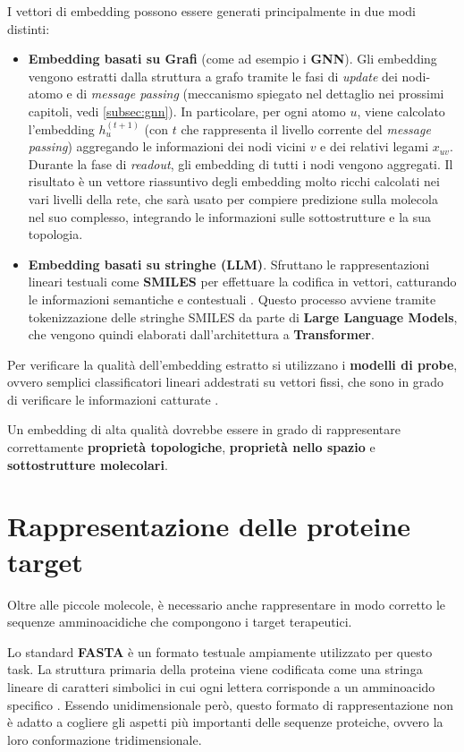I vettori di embedding possono essere generati principalmente in due modi distinti:
\begin{itemize}
    \item \textbf{Embedding basati su Grafi} (come ad esempio i \textbf{GNN}). Gli embedding vengono estratti dalla struttura a grafo tramite le fasi di \textit{update} dei nodi-atomo e di \textit{message passing} \cite{wangEvaluatingSelfSupervisedLearning2023} (meccanismo spiegato nel dettaglio nei prossimi capitoli, vedi \ref{subsec:gnn}).
    In particolare, per ogni atomo $u$, viene calcolato l'embedding $h_u^{(t+1)}$ (con $t$ che rappresenta il livello corrente del \textit{message passing}) aggregando le informazioni dei nodi vicini $v$ e dei relativi legami $x_{uv}$.
    Durante la fase di \textit{readout}, gli embedding di tutti i nodi vengono aggregati. Il risultato è un vettore riassuntivo degli embedding molto ricchi calcolati nei vari livelli della rete, che sarà usato per compiere predizione sulla molecola nel suo complesso, integrando le informazioni sulle sottostrutture e la sua topologia.
    \item \textbf{Embedding basati su stringhe (LLM)}. Sfruttano le rappresentazioni lineari testuali come \textbf{SMILES} per effettuare la codifica in vettori, catturando le informazioni semantiche e contestuali \cite{sadeghiCanLargeLanguage2024}. Questo processo avviene tramite tokenizzazione delle stringhe SMILES da parte di \textbf{Large Language Models}, che vengono quindi elaborati dall'architettura a \textbf{Transformer}.
\end{itemize}
Per verificare la qualità dell'embedding estratto si utilizzano i \textbf{modelli di probe}, ovvero semplici classificatori lineari addestrati su vettori fissi, che sono in grado di verificare le informazioni catturate \cite{wangEvaluatingSelfSupervisedLearning2023}.

Un embedding di alta qualità dovrebbe essere in grado di rappresentare correttamente \textbf{proprietà topologiche}, \textbf{proprietà nello spazio} e \textbf{sottostrutture molecolari}.
\section{Rappresentazione delle proteine target}
Oltre alle piccole molecole, è necessario anche rappresentare in modo corretto le sequenze amminoacidiche che compongono i target terapeutici.

Lo standard \textbf{FASTA} è un formato testuale ampiamente utilizzato per questo task.
La struttura primaria della proteina viene codificata come una stringa lineare di caratteri simbolici in cui ogni lettera corrisponde a un amminoacido specifico \cite{wangUnifiedSurveyDrugtarget2026a}.
Essendo unidimensionale però, questo formato di rappresentazione non è adatto a cogliere gli aspetti più importanti delle sequenze proteiche, ovvero la loro conformazione tridimensionale.

